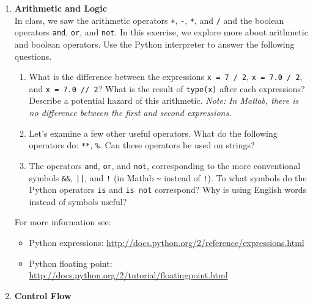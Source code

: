 \documentclass{article}
\begin{document}
\pagestyle{fancy}
\begin{enumerate}
\item \textbf{Arithmetic and Logic} \\
In class, we saw the arithmetic operators \texttt{+}, \texttt{-}, \texttt{*}, and \texttt{/} and the boolean operators \texttt{and}, \texttt{or}, and \texttt{not}.  In this exercise, we explore more about arithmetic and boolean operators.  Use the Python interpreter to answer the following questions.

\begin{enumerate}
\item What is the difference between the expressions \texttt{x = 7 / 2}, \texttt{x = 7.0 / 2}, and \texttt{x = 7.0 // 2}?  What is the result of \texttt{type(x)} after each expressions? Describe a potential hazard of this arithmetic.  \emph{Note: In Matlab, there is no difference between the first and second expressions.}
\end{enumerate}

\begin{enumerate}
\setcounter{enumii}{1}
\item Let's examine a few other useful operators.  What do the following operators do: \texttt{**}, \texttt{\%}.  Can these operators be used on strings?
\end{enumerate}

\begin{enumerate}
\setcounter{enumii}{2}
\item The operators \texttt{and}, \texttt{or}, and \texttt{not}, corresponding to the more conventional symbols \texttt{\&\&}, \texttt{||}, and \texttt{!} (in Matlab \texttt{\~} instead of \texttt{!}).  To what symbols do the Python operators \texttt{is} and \texttt{is not} correspond? Why is using English words instead of symbols useful?
\end{enumerate}

For more information see:
\begin{itemize}
\item Python expressions: \url{http://docs.python.org/2/reference/expressions.html}
\item Python floating point: \url{http://docs.python.org/2/tutorial/floatingpoint.html}
\end{itemize}



\item \textbf{Control Flow} \\


\end{enumerate}
\end{document}

